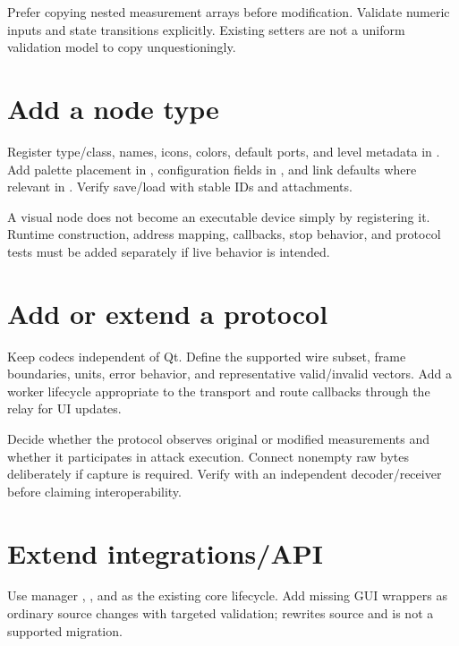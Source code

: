 Prefer copying nested measurement arrays before modification. Validate numeric inputs and state transitions explicitly. Existing setters are not a uniform validation model to copy unquestioningly.

\section*{Add a node type}
Register type/class, names, icons, colors, default ports, and level metadata in . Add palette placement in , configuration fields in , and link defaults where relevant in . Verify save/load with stable IDs and attachments.

A visual node does not become an executable device simply by registering it. Runtime construction, address mapping, callbacks, stop behavior, and protocol tests must be added separately if live behavior is intended.

\section*{Add or extend a protocol}
Keep codecs independent of Qt. Define the supported wire subset, frame boundaries, units, error behavior, and representative valid/invalid vectors. Add a worker lifecycle appropriate to the transport and route callbacks through the relay for UI updates.

Decide whether the protocol observes original or modified measurements and whether it participates in attack execution. Connect nonempty raw bytes deliberately if capture is required. Verify with an independent decoder/receiver before claiming interoperability.

\section*{Extend integrations/API}
Use manager , , and  as the existing core lifecycle. Add missing GUI wrappers as ordinary source changes with targeted validation;  rewrites source and is not a supported migration.

